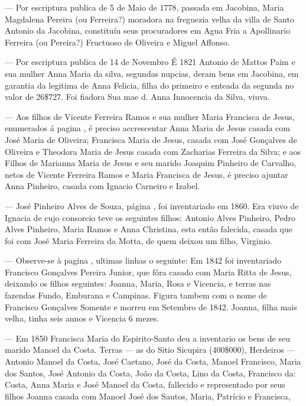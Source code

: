 — Por escriptura publica de 5 de Maio de 1778, passada em Jacobina, Maria Magdalena Pereira (ou Ferreira?) moradora na freguezia velha da villa de Santo Antonio da Jacobina, constituíu seus procuradores em Agua Fria a Apollinario Ferreira (ou Pereira?) Fructuoso de Oliveira e Miguel Affonso.

— Por escriptura publica de 14 de Novembro É 1821 Antonio de Mattos Paim e sua mulher Anna Maria da silva, segundas nupcias, deram bens em Jacobina, em garantia da legitima de Anna Felicia, filha do primeiro e enteada da segunda no valor de 26\$727. Foi fiadora Sua mae d. Anna Innocencia da Silva, viuva.

— Aos filhos de Vicente Ferreira Ramos e sua mulher Maria Francisca de Jesus, enumerados á pagina \pageref{vframos}, é preciso accrescentar Anna Maria de Jesus casada com José Maria de Oliveira; Francisca Maria de Jesus, casada com José Gonçalves de Oliveira e Theodora Maria de Jesus casada com Zacharias Ferreira da Silva; e aos Filhos de Marianna Maria de Jesus e seu marido Joaquim Pinheiro de Carvalho, netos de Vicente Ferreira Ramos e Maria Francisca de Jesus, é preciso ajuntar Anna Pinheiro, casada com Ignacio Carneiro e Izabel.

— José Pinheiro Alves de Souza, página \pageref{jpalves}, foi inventariado em 1860. Era viuvo de Ignacia de cujo consorcio teve os seguintes filhos: Antonio Alves Pinheiro, Pedro Alves Pinheiro, Maria Ramos e Anna Christina, esta então falecida, casada que foi com José Maria Ferreira da Motta, de quem deixou um filho, Virginio.

— Observe-se à pagina \pageref{fgpereira}, ultimas linhas o seguinte:
Em 1842 foi inventariado Francisco Gonçalves Pereira Junior, que fôra casado com Maria Ritta de Jesus, deixando os filhos seguintes: Joanna, Maria, Rosa e Vicencia, e terras nas fazendas Fundo, Emburana e Campinas. Figura tambem com o nome de Francisco Gonçalves Somente e morreu em Setembro de 1842. Joanna, filha mais velha, tinha seis annos e Vicencia 6 mezes.

— Em 1850 Francisca Maria do Espirito-Santo deu a inventario os bens de seu marido Manoel da Costa.
Terras — as do Sitio Sicupira (400\$000),
Herdeiros — Antonio Manoel da Costa, José Caetano, José da Costa, Manoel Francisco, Maria dos Santos, José Antonio da Costa, João da Costa, Lino da Costa, Francisco da: Costa, Anna Maria e José Manoel da Costa, fallecido e representado por seus filhos Joanna casada com Manoel José dos Sautos, Maria, Patrício e Francisca,

